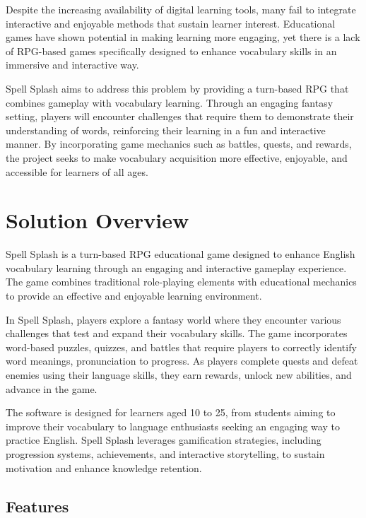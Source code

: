 Despite the increasing availability of digital learning tools, many fail to integrate interactive and enjoyable methods that sustain learner interest. Educational games have shown potential in making learning more engaging, yet there is a lack of RPG-based games specifically designed to enhance vocabulary skills in an immersive and interactive way.


Spell Splash aims to address this problem by providing a turn-based RPG that combines gameplay with vocabulary learning. Through an engaging fantasy setting, players will encounter challenges that require them to demonstrate their understanding of words, reinforcing their learning in a fun and interactive manner. By incorporating game mechanics such as battles, quests, and rewards, the project seeks to make vocabulary acquisition more effective, enjoyable, and accessible for learners of all ages.


\section{Solution Overview}
\label{section:solution-overview}

Spell Splash is a turn-based RPG educational game designed to enhance English vocabulary learning through an engaging and interactive gameplay experience. The game combines traditional role-playing elements with educational mechanics to provide an effective and enjoyable learning environment.


In Spell Splash, players explore a fantasy world where they encounter various challenges that test and expand their vocabulary skills. The game incorporates word-based puzzles, quizzes, and battles that require players to correctly identify word meanings, pronunciation to progress. As players complete quests and defeat enemies using their language skills, they earn rewards, unlock new abilities, and advance in the game.


The software is designed for learners aged 10 to 25, from students aiming to improve their vocabulary to language enthusiasts seeking an engaging way to practice English. Spell Splash leverages gamification strategies, including progression systems, achievements, and interactive storytelling, to sustain motivation and enhance knowledge retention.


\subsection{Features}
\label{subsection:features}

